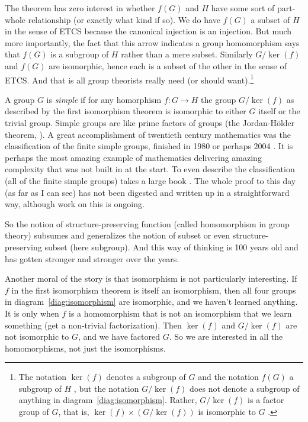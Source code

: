 \documentclass[11pt]{article}
\begin{document}
The theorem has zero interest in whether $f(G)$ and $H$ have some
sort of part-whole relationship (or exactly what kind if so).  We do have
$f(G)$ a subset of $H$ in the sense of ETCS because the canonical injection
is an injection.  But much more importantly, the fact that this arrow
indicates a group homomorphism says that $f(G)$ is a subgroup of $H$
rather than a mere subset.
Similarly $G / \ker(f)$ and $f(G)$ are isomorphic, hence
each is a subset of the other in the sense of ETCS.  And that is all group
theorists really need (or should want).\footnote{
The notation $\ker(f)$ denotes a subgroup of $G$ and
the notation $f(G)$ a subgroup of $H$ \citep[Section~II.6]{aluffi},
but the notation $G / \ker(f)$ does
not denote a subgroup of anything in diagram~\ref{diag:isomorphism}.
Rather, $G / \ker(f)$ is a factor group of $G$, that is,
$\ker(f) \times (G / \ker(f))$ is isomorphic to $G$
\citep[Section~II.3.4]{aluffi}.}

A group $G$ is \emph{simple} if for any homorphism $f : G \to H$
the group $G / \ker(f)$ as described by the first isomorphism theorem
is isomorphic to either $G$ itself or the trivial group.
Simple groups are like prime factors of groups
(the Jordan-H\"{o}lder theorem, \citealp[Theorem~IV.3.1]{aluffi}).
A great accomplishment of twentieth century mathematics was the
classification of the finite simple groups, finished in 1980 or perhaps 2004
\citep{aschbacher}.
It is perhaps the most amazing example of mathematics delivering amazing
complexity that was not built in at the start.
To even describe the classification (all of the finite simple groups)
takes a large book
\citep[more than 300 pages if frontmatter is included]{wilson}.
The whole proof to this day (as far as I can see) has not been digested
and written up in a straightforward way, although work on this is ongoing.

So the notion of structure-preserving function (called homomorphism in group
theory) subsumes and generalizes the notion of subset or even
structure-preserving subset (here subgroup).
And this way of thinking is 100 years old and has gotten stronger and stronger
over the years.

Another moral of the story is that isomorphism is not particularly interesting.
If $f$ in the first isomorphism theorem is itself an isomorphism, then all
four groups in diagram~\ref{diag:isomorphism} are isomorphic, and we haven't
learned anything.  It is only when $f$ is a homomorphism that is not an
isomorphism that we learn something (get a non-trivial factorization).
Then $\ker(f)$ and $G / \ker(f)$ are not isomorphic to $G$, and we have
factored $G$.
So we are interested in all the homomorphisms, not just the isomorphisms.
\end{document}
